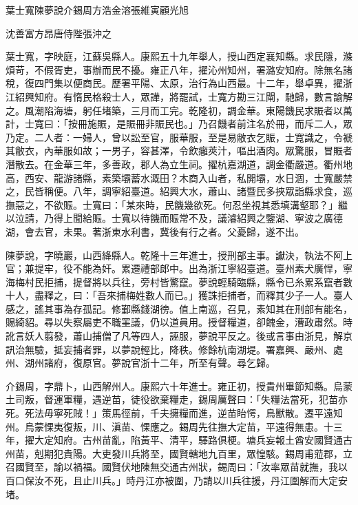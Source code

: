 
\begin{pinyinscope}
葉士寬陳夢說介錫周方浩金溶張維寅顧光旭

沈善富方昂唐侍陛張沖之

葉士寬，字映庭，江蘇吳縣人。康熙五十九年舉人，授山西定襄知縣。求民隱，滌煩苛，不假胥吏，事辦而民不擾。雍正八年，擢沁州知州，署潞安知府。除無名諸稅，復四門集以便商民。歷署平陽、太原，治行為山西最。十二年，舉卓異，擢浙江紹興知府。有惰民格殺士人，眾譁，將罷試，士寬方勘三江閘，馳歸，數言諭解之。風潮陷海塘，躬任堵築，三月而工完。乾隆初，調金華。東陽饑民求賑者以萬計，士寬曰：「按冊施賑，是賑冊非賑民也。」乃召饑者前注名於冊，而斥二人，眾乃定。二人者：一婦人，曾以訟至官，服華服，至是易敝衣乞賑，士寬識之，令褫其敝衣，內華服如故；一男子，容甚澤，令飲癰莢汁，嘔出酒肉。眾驚服，冒賑者潛散去。在金華三年，多善政，郡人為立生祠。擢杭嘉湖道，調金衢嚴道。衢州地高，西安、龍游諸縣，素築壩蓄水溉田？木商入山者，私開壩，水日涸，士寬嚴禁之，民皆稱便。八年，調寧紹臺道。紹興大水，蕭山、諸暨民多挾眾詣縣求食，巡撫惡之，不欲賑。士寬曰：「某來時，民饑幾欲死。何忍坐視其悉填溝壑耶？」繼以泣請，乃得上聞給賑。士寬以待饑而賑常不及，議濬紹興之鑒湖、寧波之廣德湖，會去官，未果。著浙東水利書，冀後有行之者。父憂歸，遂不出。

陳夢說，字曉巖，山西絳縣人。乾隆十三年進士，授刑部主事。讞決，執法不阿上官；兼提牢，役不能為奸。累遷禮部郎中。出為浙江寧紹臺道。臺州素犬廣悍，寧海梅村民拒捕，提督將以兵往，旁村皆驚竄。夢說輕騎臨縣，縣令已糸累系竄者數十人，盡釋之，曰：「吾來捕梅姓數人而已。」獲誅拒捕者，而釋其少子一人。臺人感之，謠其事為存孤記。修鄞縣錢湖徬。值上南巡，召見，素知其在刑部有能名，賜綺貂。尋以失察屬吏不職罣議，仍以道員用。授督糧道，卻餽金，漕政肅然。時訛言妖人翦發，蕭山捕僧了凡等四人，誣服，夢說平反之。後或言事由浙見，解京訊治無驗，抵妄捕者罪，以夢說輕比，降秩。修餘杭南湖堤。署嘉興、嚴州、處州、湖州諸府，復原官。夢說官浙十二年，所至有聲。尋乞歸。

介錫周，字鼎卜，山西解州人。康熙六十年進士。雍正初，授貴州畢節知縣。烏蒙土司叛，督運軍糧，遇逆苗，徒役欲棄糧走，錫周厲聲曰：「失糧法當死，犯苗亦死。死法毋寧死賊！」策馬徑前，千夫擁糧而進，逆苗眙愕，鳥獸散。遷平遠知州。烏蒙惈夷復叛，川、滇苗、惈應之。錫周先往撫大定苗，平遠得無患。十三年，擢大定知府。古州苗亂，陷黃平、清平，驛路俱梗。塘兵妄報土酋安國賢通古州苗，剋期犯貴陽。大吏發川兵將至，國賢轄地九百里，眾惶駭。錫周甫蒞郡，立召國賢至，諭以禍福。國賢伏地陳無交通古州狀，錫周曰：「汝率眾苗就撫，我以百口保汝不死，且止川兵。」時丹江亦被圍，乃請以川兵往援，丹江圍解而大定安堵。


\end{pinyinscope}
